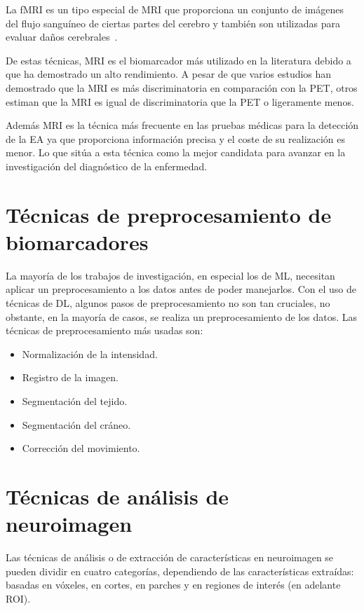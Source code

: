 La fMRI es un tipo especial de MRI que proporciona un conjunto de imágenes del flujo sanguíneo de ciertas partes del
cerebro y también son utilizadas para evaluar daños cerebrales~\cite{mayo-clinic-mri}.

De estas técnicas, MRI es el biomarcador más utilizado en la literatura debido a que ha demostrado un alto rendimiento.
A pesar de que varios estudios han demostrado que la MRI es más discriminatoria en comparación con la PET, otros estiman
que la MRI es igual de discriminatoria que la PET o ligeramente menos.

Además MRI es la técnica más frecuente en las pruebas médicas para la detección de la EA ya que proporciona información
precisa y el coste de su realización es menor.
Lo que sitúa a esta técnica como la mejor candidata para avanzar en la investigación del diagnóstico de la enfermedad.

\section{Técnicas de preprocesamiento de biomarcadores}\label{sec:preprocesamiento-estado-del-arte}
La mayoría de los trabajos de investigación, en especial los de ML, necesitan aplicar un preprocesamiento a los datos
antes de poder manejarlos.
Con el uso de técnicas de DL, algunos pasos de preprocesamiento no son tan cruciales, no obstante, en la mayoría de
casos, se realiza un preprocesamiento de los datos.
Las técnicas de preprocesamiento más usadas son:
\begin{itemize}
    \item Normalización de la intensidad.
    \item Registro de la imagen.
    \item Segmentación del tejido.
    \item Segmentación del cráneo.
    \item Corrección del movimiento.\\
\end{itemize}

\section{Técnicas de análisis de neuroimagen}\label{sec:analisis-de neuroimagen-estado-del-arte}
Las técnicas de análisis o de extracción de características en neuroimagen se pueden dividir en cuatro categorías,
dependiendo de las características extraídas: basadas en vóxeles, en cortes, en parches y en regiones de interés
(en adelante \Gls{ROI}).

